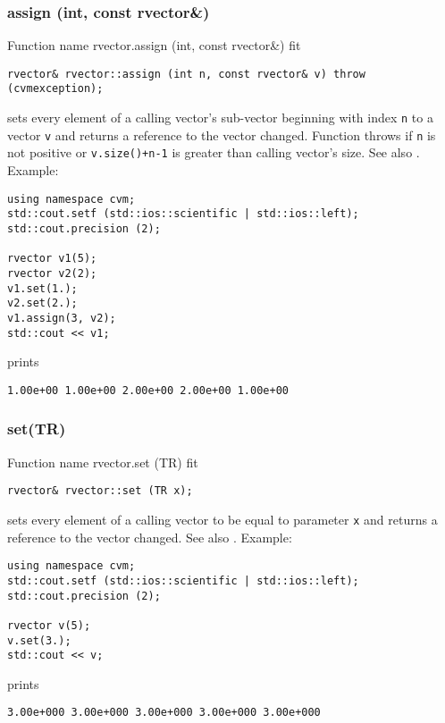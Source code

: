 \subsubsection{assign (int, const rvector\&)}
Function%
\pdfdest name {rvector.assign (int, const rvector&)} fit
\begin{verbatim}
rvector& rvector::assign (int n, const rvector& v) throw (cvmexception);
\end{verbatim}
sets every element of a calling vector's sub-vector
beginning with \Based index \verb"n" to a vector \verb"v"
and returns a reference to the vector changed.
Function throws  
if \verb"n" is not positive or \verb"v.size()+n-1" is greater than
calling vector's size.
See also .
Example:
\begin{Verbatim}
using namespace cvm;
std::cout.setf (std::ios::scientific | std::ios::left); 
std::cout.precision (2);

rvector v1(5);
rvector v2(2);
v1.set(1.);
v2.set(2.);
v1.assign(3, v2);
std::cout << v1;
\end{Verbatim}
prints
\begin{Verbatim}
1.00e+00 1.00e+00 2.00e+00 2.00e+00 1.00e+00
\end{Verbatim}
\newpage


\subsubsection{set(TR)}
Function%
\pdfdest name {rvector.set (TR)} fit
\begin{verbatim}
rvector& rvector::set (TR x);
\end{verbatim}
sets every element of a calling vector to be equal to
parameter \verb"x"
and returns a reference to the vector changed.
See also .
Example:
\begin{Verbatim}
using namespace cvm;
std::cout.setf (std::ios::scientific | std::ios::left); 
std::cout.precision (2);

rvector v(5);
v.set(3.);
std::cout << v;
\end{Verbatim}
prints
\begin{Verbatim}
3.00e+000 3.00e+000 3.00e+000 3.00e+000 3.00e+000
\end{Verbatim}
\newpage



